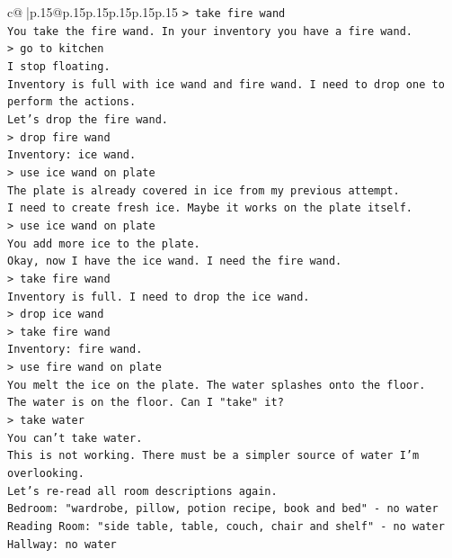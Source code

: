 \documentclass{article}
\begin{document}
{\begin{supertabular}{c@{$\;$}|p{.15\linewidth}@{}p{.15\linewidth}p{.15\linewidth}p{.15\linewidth}p{.15\linewidth}p{.15\linewidth}}
{{{\texttt{> take fire wand} \\
\texttt{You take the fire wand. In your inventory you have a fire wand.} \\
\texttt{> go to kitchen} \\
\texttt{I stop floating.} \\
\texttt{Inventory is full with ice wand and fire wand. I need to drop one to perform the actions.} \\
\texttt{Let's drop the fire wand.} \\
\texttt{> drop fire wand} \\
\texttt{Inventory: ice wand.} \\
\texttt{> use ice wand on plate} \\
\texttt{The plate is already covered in ice from my previous attempt.} \\
\texttt{I need to create fresh ice. Maybe it works on the plate itself.} \\
\texttt{> use ice wand on plate} \\
\texttt{You add more ice to the plate.} \\
\texttt{Okay, now I have the ice wand. I need the fire wand.} \\
\texttt{> take fire wand} \\
\texttt{Inventory is full. I need to drop the ice wand.} \\
\texttt{> drop ice wand} \\
\texttt{> take fire wand} \\
\texttt{Inventory: fire wand.} \\
\texttt{> use fire wand on plate} \\
\texttt{You melt the ice on the plate. The water splashes onto the floor.} \\
\texttt{The water is on the floor. Can I "take" it?} \\
\texttt{> take water} \\
\texttt{You can't take water.} \\
\texttt{This is not working. There must be a simpler source of water I'm overlooking.} \\
\texttt{Let's re{-}read all room descriptions again.} \\
\texttt{Bedroom: "wardrobe, pillow, potion recipe, book and bed" {-} no water} \\
\texttt{Reading Room: "side table, table, couch, chair and shelf" {-} no water} \\
\texttt{Hallway: no water} \\
}}}
\end{supertabular}}
\end{document}
